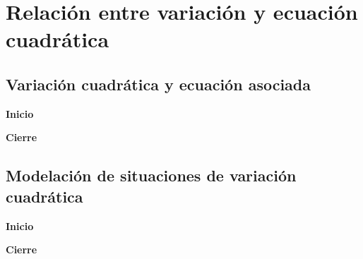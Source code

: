 \thispagestyle{plain}
\section{Relación entre variación y ecuación cuadrática}
\subsection{Variación cuadrática y ecuación asociada}

\begin{boxK}
    \begin{center}\textbf{Inicio}\end{center}

\end{boxK}

\begin{boxK}
    \begin{center}\textbf{Cierre}\end{center}

\end{boxK}

\subsection{Modelación de situaciones de variación cuadrática}

\begin{boxK}
    \begin{center}\textbf{Inicio}\end{center}

\end{boxK}

\begin{boxK}
    \begin{center}\textbf{Cierre}\end{center}

\end{boxK}

\newpage